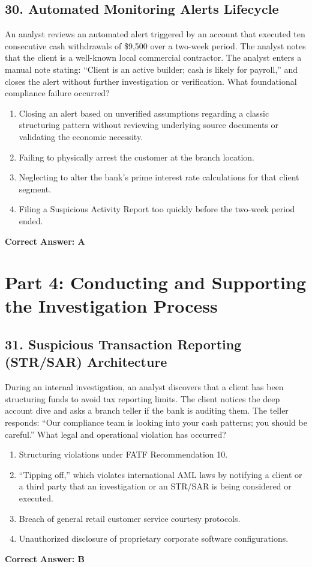 \documentclass[11pt,a4paper]{article}
\begin{document}
	\subsection{30. Automated Monitoring Alerts Lifecycle}
	An analyst reviews an automated alert triggered by an account that executed ten consecutive cash withdrawals of \$9,500 over a two-week period. The analyst notes that the client is a well-known local commercial contractor. The analyst enters a manual note stating: ``Client is an active builder; cash is likely for payroll,'' and closes the alert without further investigation or verification. What foundational compliance failure occurred?
	\begin{enumerate}[label=\Alph*.]
		\item Closing an alert based on unverified assumptions regarding a classic structuring pattern without reviewing underlying source documents or validating the economic necessity.
		\item Failing to physically arrest the customer at the branch location.
		\item Neglecting to alter the bank's prime interest rate calculations for that client segment.
		\item Filing a Suspicious Activity Report too quickly before the two-week period ended.
	\end{enumerate}
	\textbf{Correct Answer: A}
	
	\newpage
	\section{Part 4: Conducting and Supporting the Investigation Process}
	
	\subsection{31. Suspicious Transaction Reporting (STR/SAR) Architecture}
	During an internal investigation, an analyst discovers that a client has been structuring funds to avoid tax reporting limits. The client notices the deep account dive and asks a branch teller if the bank is auditing them. The teller responds: ``Our compliance team is looking into your cash patterns; you should be careful.'' What legal and operational violation has occurred?
	\begin{enumerate}[label=\Alph*.]
		\item Structuring violations under FATF Recommendation 10.
		\item ``Tipping off,'' which violates international AML laws by notifying a client or a third party that an investigation or an STR/SAR is being considered or executed.
		\item Breach of general retail customer service courtesy protocols.
		\item Unauthorized disclosure of proprietary corporate software configurations.
	\end{enumerate}
	\textbf{Correct Answer: B}
	
\end{document}
